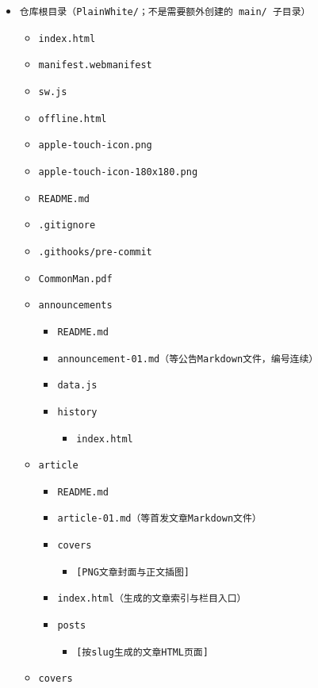 \documentclass[fontset=fandol]{ctexrep}
\begin{document}
\begin{itemize}
	\item{\verb|仓库根目录（PlainWhite/；不是需要额外创建的 main/ 子目录）|}
	\begin{itemize}
		\item{\verb|index.html|}
		\item{\verb|manifest.webmanifest|}
		\item{\verb|sw.js|}
		\item{\verb|offline.html|}
		\item{\verb|apple-touch-icon.png|}
		\item{\verb|apple-touch-icon-180x180.png|}
		\item{\verb|README.md|}
		\item{\verb|.gitignore|}
		\item{\verb|.githooks/pre-commit|}
		\item{\verb|CommonMan.pdf|}
		\item{\verb|announcements|}
		\begin{itemize}
			\item{\verb|README.md|}
			\item{\verb|announcement-01.md（等公告Markdown文件，编号连续）|}
			\item{\verb|data.js|}
			\item{\verb|history|}
			\begin{itemize}
				\item{\verb|index.html|}
			\end{itemize}
		\end{itemize}
		\item{\verb|article|}
		\begin{itemize}
			\item{\verb|README.md|}
			\item{\verb|article-01.md（等首发文章Markdown文件）|}
			\item{\verb|covers|}
			\begin{itemize}
				\item{\verb|[PNG文章封面与正文插图]|}
			\end{itemize}
			\item{\verb|index.html（生成的文章索引与栏目入口）|}
			\item{\verb|posts|}
			\begin{itemize}
				\item{\verb|[按slug生成的文章HTML页面]|}
			\end{itemize}
		\end{itemize}
		\item{\verb|covers|}

\end{itemize}
\end{itemize}
\end{document}
